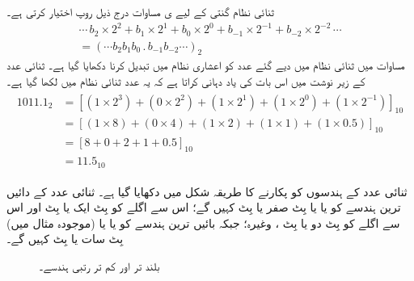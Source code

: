 	 ثنائی نظام گنتی کے لیے ی مساوات  درج ذیل روپ اختیار کرتی ہے۔
\begin{multline}\label{مساوات_ثنائی_عمومی_روپ_ثنائی}
\cdots\, b_2\times 2^2+b_1\times 2^1+b_0\times 2^0+b_{-1}\times 2^{-1}+b_{-2}\times 2^{-2}\,\cdots\\
=(\cdots b_2b_1b_0\, .\, b_{-1}b_{-2}\cdots)_{2}
\end{multline}
	مساوات  میں ثنائی نظام میں دیے گئے عدد کو اعشاری نظام میں تبدیل کرنا دکھایا گیا ہے۔ ثنائی عدد کے زیر نوشت میں  اس بات کی یاد دہانی کراتا ہے کہ یہ عدد ثنائی نظام میں لکھا گیا ہے۔
\begin{gather} 
\begin{aligned}\label{مساوات_ثنائی_مثال}
1011.1_2&=[(1\times 2^3)+(0\times 2^2)+(1\times 2^1)+(1\times 2^0)+(1\times 2^{-1})]_{10}\\
&=[(1\times 8)+(0\times 4)+(1\times 2)+(1\times 1)+(1\times 0.5)]_{10}\\
&=[8+0+2+1+0.5]_{10}\\
&=11.5_{10}
\end{aligned}
\end{gather}
	
 ثنائی عدد کے ہندسوں کو پکارنے کا طریقہ شکل  میں دکھایا گیا ہے۔ ثنائی عدد کے دائیں ترین ہندسے کو   یا    یا بِٹ صفر یا بِٹ  کہیں گے؛ اس سے اگلے کو بِٹ ایک یا بِٹ  اور اس سے اگلے کو بِٹ دو یا بِٹ ، وغیرہ؛ جبکہ بائیں ترین ہندسے کو   یا  یا (موجودہ مثال میں) بِٹ سات یا بِٹ  کہیں گے۔

\begin{figure}
\centering
{}
\caption{بلند تر اور کم تر رتبی ہندسے۔}
\label{شکل_ثنائی_رتبہ_ہندسہ}
\end{figure}

